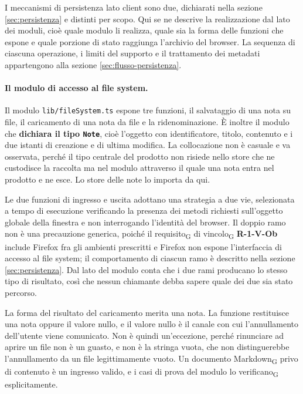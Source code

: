 \documentclass[a4paper, 10pt]{article}
\begin{document}
I meccanismi di persistenza lato client sono due, dichiarati nella sezione \ref{sec:persistenza} e distinti per scopo. Qui se ne descrive la realizzazione dal lato dei moduli, cioè quale modulo li realizza, quale sia la forma delle funzioni che espone e quale porzione di stato raggiunga l'archivio del browser. La sequenza di ciascuna operazione, i limiti del supporto e il trattamento dei metadati appartengono alla sezione \ref{sec:flusso-persistenza}.

\paragraph{Il modulo di accesso al file system.}
Il modulo \texttt{lib/fileSystem.ts} espone tre funzioni, il salvataggio di una nota su file, il caricamento di una nota da file e la ridenominazione. È inoltre il modulo che \textbf{dichiara il tipo \texttt{Note}}, cioè l'oggetto con identificatore, titolo, contenuto e i due istanti di creazione e di ultima modifica. La collocazione non è casuale e va osservata, perché il tipo centrale del prodotto non risiede nello store che ne custodisce la raccolta ma nel modulo attraverso il quale una nota entra nel prodotto e ne esce. Lo store delle note lo importa da qui.

Le due funzioni di ingresso e uscita adottano una strategia a due vie, selezionata a tempo di esecuzione verificando la presenza dei metodi richiesti sull'oggetto globale della finestra e non interrogando l'identità del browser. Il doppio ramo non è una precauzione generica, poiché il requisito\textsubscript{G} di vincolo\textsubscript{G} \textbf{R-1-V-Ob} include Firefox fra gli ambienti prescritti e Firefox non espone l'interfaccia di accesso al file system; il comportamento di ciascun ramo è descritto nella sezione \ref{sec:persistenza}. Dal lato del modulo conta che i due rami producano lo stesso tipo di risultato, così che nessun chiamante debba sapere quale dei due sia stato percorso.

La forma del risultato del caricamento merita una nota. La funzione restituisce una nota oppure il valore nullo, e il valore nullo è il canale con cui l'annullamento dell'utente viene comunicato. Non è quindi un'eccezione, perché rinunciare ad aprire un file non è un guasto, e non è la stringa vuota, che non distinguerebbe l'annullamento da un file legittimamente vuoto. Un documento Markdown\textsubscript{G} privo di contenuto è un ingresso valido, e i casi di prova del modulo lo verificano\textsubscript{G} esplicitamente.
\end{document}
